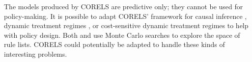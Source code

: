 The models produced by CORELS are predictive only; they cannot be used for policy-making. It is possible to adapt CORELS' framework for causal inference \cite{CFRL}, dynamic treatment regimes \citep{ZhangEtAl15}, or cost-sensitive dynamic treatment regimes \citep{LakkarajuRu17} to help with policy design. Both \citet{WangRu15} and \citet{LakkarajuRu17} use Monte Carlo searches to explore the space of rule lists. CORELS could potentially be adapted to handle these kinds of interesting problems. 

